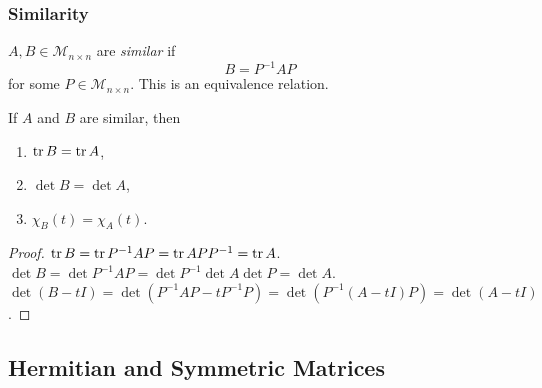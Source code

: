 \documentclass[a4paper]{article}
\begin{document}
    \subsubsection{Similarity}
    \begin{definition}
      $ A,B\in \mathcal{M}_{n\times n} $ are \textit{similar} if
      \[
        B=P^{-1}AP
      \]
      for some $ P\in \mathcal{M}_{n \times n} $. This is an
      equivalence relation.
    \end{definition}
    \begin{proposition}
      If $A$ and $B$ are similar, then
      \begin{enumerate}
        \item $ \tr B=\tr A $,
        \item $ \det B=\det A $,
        \item $ \chi_B(t)=\chi_A(t) $.
      \end{enumerate}
    \end{proposition}
    \begin{proof}
      $ \tr B=\tr P^{-1}AP=\tr APP^{-1}=\tr A $. \\
      $ \det B=\det P^{-1}AP=\det P^{-1}\det A \det P=\det A $. \\
      $ \det (B-tI)=\det (P^{-1}AP-tP^{-1}P)=\det (P^{-1}(A-tI)P)=\det (A-tI) $.
    \end{proof}
    \subsection{Hermitian and Symmetric Matrices}
\end{document}
